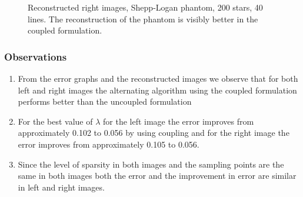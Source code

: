 \begin{enumerate}
\begin{figure}[H]
\hspace{0.4in}
\hspace{0.2in}
\caption [Reconstructed right images, Shepp-Logan phantom, 200 stars, 40 lines]{Reconstructed right images, Shepp-Logan phantom, 200 stars, 40 lines. The reconstruction of the phantom is visibly better in the coupled formulation.}
\label{fig:expt56}
\end{figure}
\end{enumerate}
\subsubsection{Observations}
\begin{enumerate}
\item From the error graphs and the reconstructed images we observe that for both left and right images the alternating algorithm using the coupled formulation performs better than the uncoupled formulation
\item For the best value of $\lambda$ for the left image the error improves from approximately 0.102 to 0.056 by using coupling and for the right image the error improves from approximately 0.105 to 0.056.
\item Since the level of sparsity in both images and the sampling points are the same in both images both the error and the improvement in error are similar in left and right images.
\end{enumerate}

